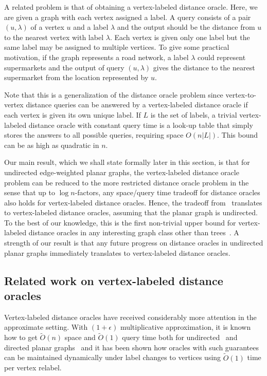\documentclass[a4paper,UKenglish,cleveref, autoref, thm-restate]{article}
\begin{document}
A related problem is that of obtaining a vertex-labeled distance oracle. Here, we are given a graph with each vertex assigned a label. A query consists of a pair $(u,\lambda)$ of a vertex $u$ and a label $\lambda$ and the output should be the distance from $u$ to the nearest vertex with label $\lambda$. Each vertex is given only one label but the same label may be assigned to multiple vertices. To give some practical motivation, if the graph represents a road network, a label $\lambda$ could represent supermarkets and the output of query $(u,\lambda)$ gives the distance to the nearest supermarket from the location represented by $u$.

Note that this is a generalization of the distance oracle problem since vertex-to-vertex distance queries can be answered by a vertex-labeled distance oracle if each vertex is given its own unique label. If $L$ is the set of labels, a trivial vertex-labeled distance oracle with constant query time is a look-up table that simply stores the answers to all possible queries, requiring space $O(n|L|)$. This bound can be as high as quadratic in $n$.

Our main result, which we shall state formally later in this section, is that for undirected edge-weighted planar graphs, the vertex-labeled distance oracle problem can be reduced to the more restricted distance oracle problem in the sense that up to $\log n$-factors, any space/query time tradeoff for distance oracles also holds for vertex-labeled distance oracles. Hence, the tradeoff from~\cite{Long2021} translates to vertex-labeled distance oracles, assuming that the planar graph is undirected. To the best of our knowledge, this is the first non-trivial upper bound for vertex-labeled distance oracles in any interesting graph class other than trees~\cite{Gawrychowski2018a,Tsur2018}. A strength of our result is that any future progress on distance oracles in undirected planar graphs immediately translates to vertex-labeled distance oracles.

\subsection{Related work on vertex-labeled distance oracles}
Vertex-labeled distance oracles have received considerably more attention in the approximate setting. With $(1+\epsilon)$ multiplicative approximation, it is known how to get $\tilde O(n)$ space and $\tilde O(1)$ query time both for undirected~\cite{Li2013} and directed planar graphs~\cite{Mozes2018} and it has been shown how oracles with such guarantees can be maintained dynamically under label changes to vertices using $\tilde O(1)$ time per vertex relabel.
\end{document}
